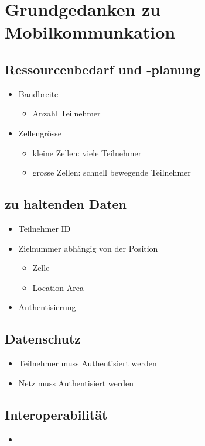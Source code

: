 \section{Grundgedanken zu Mobilkommunkation}
\subsection{Ressourcenbedarf und -planung}
\begin{itemize}
\item Bandbreite
\begin{itemize}
\item Anzahl Teilnehmer
\end{itemize}
\item Zellengrösse
\begin{itemize}
\item kleine Zellen: viele Teilnehmer
\item grosse Zellen: schnell bewegende Teilnehmer
\end{itemize}
\end{itemize}

\subsection{zu haltenden Daten}
\begin{itemize}
\item Teilnehmer ID
\item Zielnummer abhängig von der Position
\begin{itemize}
\item Zelle
\item Location Area
\end{itemize}
\item Authentisierung
\end{itemize}

\subsection{Datenschutz}
\begin{itemize}
\item Teilnehmer muss Authentisiert werden
\item Netz muss Authentisiert werden
\end{itemize}
\subsection{Interoperabilität}
\begin{itemize}
\item 
\end{itemize}

